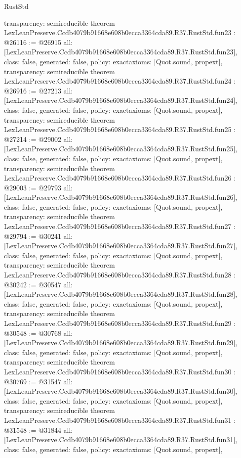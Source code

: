 \begin{lexlean}{RustStd}
\begin{coremodule}
{  transparency: semireducible
}
theorem LexLeanPreserve.Ccdb4079b91668e608b0ecca3364cda89.R37.RustStd.fun23 : @26116 := @26915 {
  all: [LexLeanPreserve.Ccdb4079b91668e608b0ecca3364cda89.R37.RustStd.fun23],
  class: false,
  generated: false,
  policy: exact{axioms: [Quot.sound, propext]},
  transparency: semireducible
}
theorem LexLeanPreserve.Ccdb4079b91668e608b0ecca3364cda89.R37.RustStd.fun24 : @26916 := @27213 {
  all: [LexLeanPreserve.Ccdb4079b91668e608b0ecca3364cda89.R37.RustStd.fun24],
  class: false,
  generated: false,
  policy: exact{axioms: [Quot.sound, propext]},
  transparency: semireducible
}
theorem LexLeanPreserve.Ccdb4079b91668e608b0ecca3364cda89.R37.RustStd.fun25 : @27214 := @29002 {
  all: [LexLeanPreserve.Ccdb4079b91668e608b0ecca3364cda89.R37.RustStd.fun25],
  class: false,
  generated: false,
  policy: exact{axioms: [Quot.sound, propext]},
  transparency: semireducible
}
theorem LexLeanPreserve.Ccdb4079b91668e608b0ecca3364cda89.R37.RustStd.fun26 : @29003 := @29793 {
  all: [LexLeanPreserve.Ccdb4079b91668e608b0ecca3364cda89.R37.RustStd.fun26],
  class: false,
  generated: false,
  policy: exact{axioms: [Quot.sound, propext]},
  transparency: semireducible
}
theorem LexLeanPreserve.Ccdb4079b91668e608b0ecca3364cda89.R37.RustStd.fun27 : @29794 := @30241 {
  all: [LexLeanPreserve.Ccdb4079b91668e608b0ecca3364cda89.R37.RustStd.fun27],
  class: false,
  generated: false,
  policy: exact{axioms: [Quot.sound, propext]},
  transparency: semireducible
}
theorem LexLeanPreserve.Ccdb4079b91668e608b0ecca3364cda89.R37.RustStd.fun28 : @30242 := @30547 {
  all: [LexLeanPreserve.Ccdb4079b91668e608b0ecca3364cda89.R37.RustStd.fun28],
  class: false,
  generated: false,
  policy: exact{axioms: [Quot.sound, propext]},
  transparency: semireducible
}
theorem LexLeanPreserve.Ccdb4079b91668e608b0ecca3364cda89.R37.RustStd.fun29 : @30548 := @30768 {
  all: [LexLeanPreserve.Ccdb4079b91668e608b0ecca3364cda89.R37.RustStd.fun29],
  class: false,
  generated: false,
  policy: exact{axioms: [Quot.sound, propext]},
  transparency: semireducible
}
theorem LexLeanPreserve.Ccdb4079b91668e608b0ecca3364cda89.R37.RustStd.fun30 : @30769 := @31547 {
  all: [LexLeanPreserve.Ccdb4079b91668e608b0ecca3364cda89.R37.RustStd.fun30],
  class: false,
  generated: false,
  policy: exact{axioms: [Quot.sound, propext]},
  transparency: semireducible
}
theorem LexLeanPreserve.Ccdb4079b91668e608b0ecca3364cda89.R37.RustStd.fun31 : @31548 := @31844 {
  all: [LexLeanPreserve.Ccdb4079b91668e608b0ecca3364cda89.R37.RustStd.fun31],
  class: false,
  generated: false,
  policy: exact{axioms: [Quot.sound, propext]},
}
\end{coremodule}
\end{lexlean}

